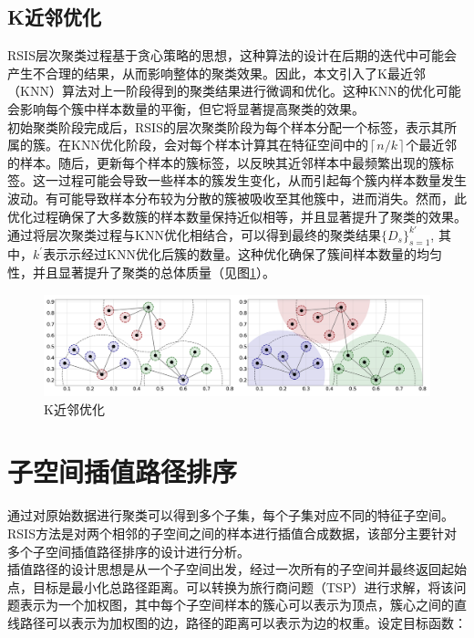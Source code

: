 \documentclass{NauThesis}
\begin{document}
\subsection{K近邻优化}
RSIS层次聚类过程基于贪心策略的思想，这种算法的设计在后期的迭代中可能会产生不合理的结果，从而影响整体的聚类效果。因此，本文引入了K最近邻（KNN）算法对上一阶段得到的聚类结果进行微调和优化。这种KNN的优化可能会影响每个簇中样本数量的平衡，但它将显著提高聚类的效果。
\\\hspace*{2em}初始聚类阶段完成后，RSIS的层次聚类阶段为每个样本分配一个标签，表示其所属的簇。在KNN优化阶段，会对每个样本计算其在特征空间中的$\left\lceil n/k\right\rceil$个最近邻的样本。随后，更新每个样本的簇标签，以反映其近邻样本中最频繁出现的簇标签。这一过程可能会导致一些样本的簇发生变化，从而引起每个簇内样本数量发生波动。有可能导致样本分布较为分散的簇被吸收至其他簇中，进而消失。然而，此优化过程确保了大多数簇的样本数量保持近似相等，并且显著提升了聚类的效果。通过将层次聚类过程与KNN优化相结合，可以得到最终的聚类结果$\{D_s\}_{s=1}^{k\prime}$,
其中，$k^{\prime}$表示示经过KNN优化后簇的数量。这种优化确保了簇间样本数量的均匀性，并且显著提升了聚类的总体质量（见图\ref{fig3}）。

\begin{figure}[htbp]
    \centering
    \includegraphics[width=1.0\textwidth]{figs/fig3.png}
    \caption{K近邻优化}
    \label{fig3}
\end{figure}

\section{子空间插值路径排序}
通过对原始数据进行聚类可以得到多个子集，每个子集对应不同的特征子空间。RSIS方法是对两个相邻的子空间之间的样本进行插值合成数据，该部分主要针对多个子空间插值路径排序的设计进行分析。
\\\hspace*{2em}插值路径的设计思想是从一个子空间出发，经过一次所有的子空间并最终返回起始点，目标是最小化总路径距离。可以转换为旅行商问题（TSP）进行求解，将该问题表示为一个加权图，其中每个子空间样本的簇心可以表示为顶点，簇心之间的直线路径可以表示为加权图的边，路径的距离可以表示为边的权重。设定目标函数：
\end{document}
